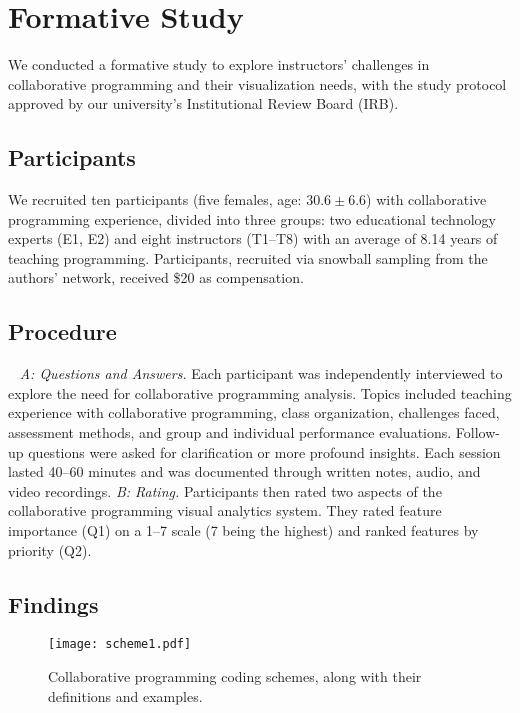 \section{Formative Study} 
\label{sec:formative}
We conducted a formative study to explore instructors' challenges in collaborative programming and their visualization needs, with the study protocol approved by our university's Institutional Review Board (IRB).
 
 \subsection{Participants}
We recruited ten participants (five females, age: \(30.6 \pm 6.6\)) with collaborative programming experience, divided into three groups: two educational technology experts (E1, E2) and eight instructors (T1–T8) with an average of 8.14 years of teaching programming. Participants, recruited via snowball sampling from the authors' network, received \$20 as compensation.
 

\subsection{Procedure}\
\textit{A: Questions and Answers.} 
Each participant was independently interviewed to explore the need for collaborative programming analysis. Topics included teaching experience with collaborative programming, class organization, challenges faced, assessment methods, and group and individual performance evaluations. Follow-up questions were asked for clarification or more profound insights. Each session lasted 40–60 minutes and was documented through written notes, audio, and video recordings.
\textit{B: Rating.} 
Participants then rated two aspects of the collaborative programming visual analytics system. They rated feature importance (Q1) on a 1–7 scale (7 being the highest) and ranked features by priority (Q2). 
\RR{More details are in appendix A.}

 
\subsection{Findings} 

\begin{figure*}[htbp]
	\centering
	\texttt{[image: scheme1.pdf]}
	\caption{Collaborative programming coding schemes, along with their definitions and examples.}
	\label{fig:scheme}
\end{figure*}



